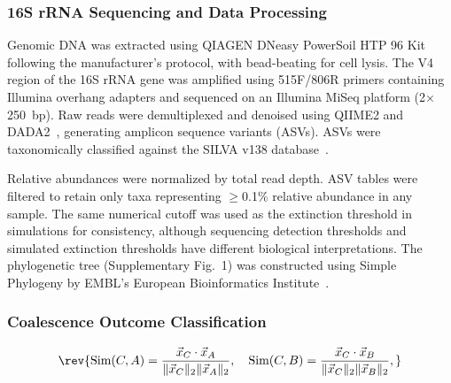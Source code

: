 \subsubsection*{16S rRNA Sequencing and Data Processing}
\label{sec:suppl:methods:sequencing}

Genomic DNA was extracted using QIAGEN DNeasy PowerSoil HTP 96 Kit following the manufacturer's protocol, with bead-beating for cell lysis. The V4 region of the 16S rRNA gene was amplified using 515F/806R primers containing Illumina overhang adapters and sequenced on an Illumina MiSeq platform (2$\times$250~bp). Raw reads were demultiplexed and denoised using QIIME2 and DADA2~\citep{Callahan2016}, generating amplicon sequence variants (ASVs). ASVs were taxonomically classified against the SILVA v138 database~\citep{Quast2013}.

Relative abundances were normalized by total read depth. ASV tables were filtered to retain only taxa representing $\geq$0.1\% relative abundance in any sample. The same numerical cutoff was used as the extinction threshold in simulations for consistency, although sequencing detection thresholds and simulated extinction thresholds have different biological interpretations. The phylogenetic tree (Supplementary Fig.~1) was constructed using Simple Phylogeny by EMBL's European Bioinformatics Institute~\citep{Madeira2022}.


\subsubsection*{Coalescence Outcome Classification}
\label{sec:suppl:methods:classification}

\begin{equation}
\rev{\text{Sim}(C, A) = \frac{\vec{x}_C \cdot \vec{x}_A}{\|\vec{x}_C\|_2 \|\vec{x}_A\|_2}, \quad
\text{Sim}(C, B) = \frac{\vec{x}_C \cdot \vec{x}_B}{\|\vec{x}_C\|_2 \|\vec{x}_B\|_2},}
\end{equation}

